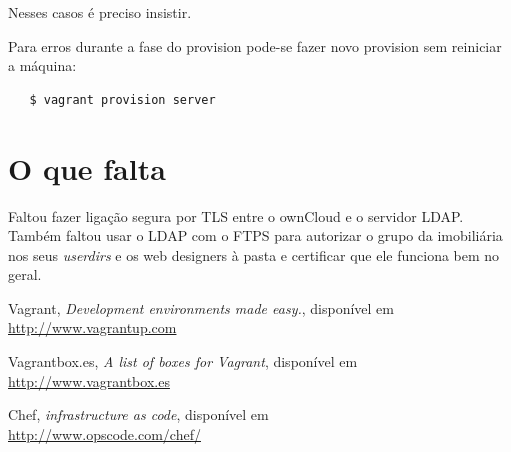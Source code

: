 \documentclass[12pt,a4paper]{report}
\begin{document}
Nesses casos é preciso insistir.

Para erros durante a fase do provision pode-se fazer novo provision sem reiniciar a máquina:

\begin{verbatim}
   $ vagrant provision server
\end{verbatim}

\chapter{O que falta}

Faltou fazer ligação segura por TLS entre o ownCloud e o servidor LDAP. Também faltou usar o LDAP com o FTPS para autorizar o grupo da imobiliária nos seus \emph{userdirs} e os web designers à pasta  e certificar que ele funciona bem no geral.

\begin{thebibliography}{9}

 Vagrant, \emph{Development environments made easy.}, disponível em\\
\small{\url{http://www.vagrantup.com}}

 Vagrantbox.es, \emph{A list of boxes for Vagrant}, disponível em\\
\small{\url{http://www.vagrantbox.es}}

 Chef, \emph{infrastructure as code}, disponível em\\
\small{\url{http://www.opscode.com/chef/}}

\end{thebibliography}
\end{document}
